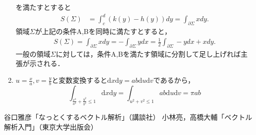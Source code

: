 \documentclass{jarticle}
\def\d{\mathrm d}
\begin{document}
\begin{enumerate}
      を満たすとすると
          \begin{align*}
      S(\Sigma)&=\int_{c}^{d} \left( k(y)-h(y) \right) dy =\int _{\partial \Sigma} x dy.
      \end{align*}
領域$\Sigma$が上記の条件A,Bを同時に満たすとすると，
\begin{align}
S(\Sigma)=\int _{\partial \Sigma}xdy=
-\int _{\partial \Sigma}ydx=\frac{1}{2}\int _{\partial \Sigma}-ydx+xdy.
\end{align}
一般の領域$\Sigma$に対しては，条件A,Bを満たす領域に分割して足し上げれば主張が示される．
    \item
      $u = \frac{x}{a}, v = \frac{y}{b}$と変数変換すると$\d x \d y = a b \d u \d v$であるから，
      \[ \int_{\frac{x^2}{a^2}+\frac{y^2}{b^2} \leq 1 } \d x \d y = \int_{u^2+v^2 \leq 1} ab \d u \d v = \pi ab \]
  \end{enumerate}
  \newpage
\begin{thebibliography}{99}
 谷口雅彦「なっとくするベクトル解析」（講談社）
 小林亮，高橋大輔「ベクトル解析入門」（東京大学出版会）

\end{thebibliography}
\end{document}
